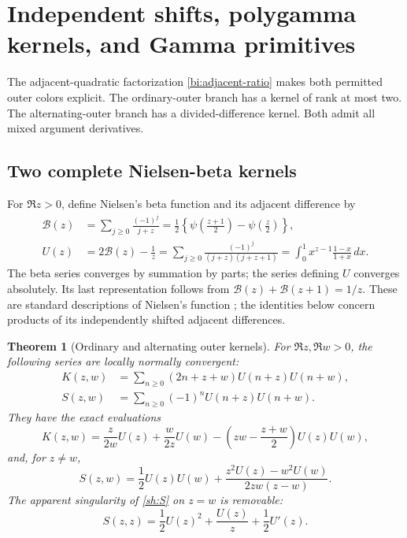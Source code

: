 \documentclass[11pt,letterpaper]{article}
\numberwithin{equation}{section}
\newtheorem{theorem}{Theorem}[section]
\theoremstyle{definition}
\theoremstyle{remark}
\newcommand{\Bcal}{\mathcal B}
\begin{document}


\section{Independent shifts, polygamma kernels, and Gamma primitives}
\label{sec:shifted}

The adjacent-quadratic factorization \eqref{bi:adjacent-ratio} makes
both permitted outer colors explicit. The ordinary-outer branch has
a kernel of rank at most two. The alternating-outer branch has a
divided-difference kernel. Both admit all mixed argument derivatives.

\subsection{Two complete Nielsen-beta kernels}

For $\Re z>0$, define Nielsen's beta function and its adjacent difference
by
\begin{align}
 \Bcal(z)&=\sum_{j\ge0}\frac{(-1)^j}{j+z}
    =\frac12\left\{\psi\left(\frac{z+1}{2}\right)
                           -\psi\left(\frac z2\right)\right\},
       \label{sh:beta}\\
 U(z)&=2\Bcal(z)-\frac1z
     =\sum_{j\ge0}\frac{(-1)^j}{(j+z)(j+z+1)}
     =\int_0^1 x^{z-1}\frac{1-x}{1+x}\,dx.
       \label{sh:U}
\end{align}
The beta series converges by summation by parts; the series defining
$U$ converges absolutely. Its last representation follows from
$\Bcal(z)+\Bcal(z+1)=1/z$. These are standard descriptions of
Nielsen's function \cite{NielsenBeta}; the identities below concern
products of its independently shifted adjacent differences.

\begin{theorem}[Ordinary and alternating outer kernels]
\label{sh:two-kernels}
For $\Re z,\Re w>0$, the following series are locally normally
convergent:
\begin{align}
 K(z,w)&=\sum_{n\ge0}(2n+z+w)U(n+z)U(n+w),\label{sh:Kdef}\\
 S(z,w)&=\sum_{n\ge0}(-1)^nU(n+z)U(n+w).\label{sh:Sdef}
\end{align}
They have the exact evaluations
\begin{equation}\label{sh:K}
 \boxed{\displaystyle
 K(z,w)=\frac{z}{2w}U(z)+\frac{w}{2z}U(w)
                -\left(zw-\frac{z+w}{2}\right)U(z)U(w),}
\end{equation}
and, for $z\ne w$,
\begin{equation}\label{sh:S}
 \boxed{\displaystyle
 S(z,w)=\frac12U(z)U(w)
      +\frac{z^2U(z)-w^2U(w)}{2zw(z-w)}.}
\end{equation}
The apparent singularity of \eqref{sh:S} on $z=w$ is removable:
\begin{equation}\label{sh:Sdiagonal}
 S(z,z)=\frac12U(z)^2+\frac{U(z)}z+\frac12U'(z).
\end{equation}
\end{theorem}
\end{document}
